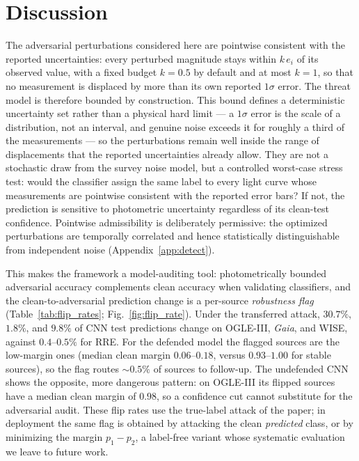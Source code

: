 \documentclass{aa}
\begin{document}
\section{Discussion}\label{sec:discussion}
The adversarial perturbations considered here are pointwise consistent with
the reported uncertainties: every perturbed magnitude stays within $k\,e_i$
of its observed value, with a fixed budget $k = 0.5$ by default and at most
$k = 1$, so that no measurement is displaced by more than its own reported
$1\sigma$ error. The threat model is therefore bounded by construction. This
bound defines a deterministic uncertainty set rather than a physical hard
limit --- a $1\sigma$ error is the scale of a distribution, not an interval,
and genuine noise exceeds it for roughly a third of the measurements --- so
the perturbations remain well inside the range of displacements that the
reported uncertainties already allow. They are not a stochastic draw from
the survey noise model, but a controlled worst-case stress test: would the
classifier assign the same label to every light curve whose measurements
are pointwise consistent with the reported error bars? If not, the
prediction is sensitive to photometric uncertainty regardless of its
clean-test confidence. Pointwise admissibility is deliberately permissive:
the optimized perturbations are temporally correlated and hence
statistically distinguishable from independent noise
(Appendix~\ref{app:detect}).

This makes the framework a model-auditing tool: photometrically bounded adversarial accuracy complements clean accuracy when validating classifiers, and the clean-to-adversarial prediction change is a per-source \emph{robustness flag} (Table~\ref{tab:flip_rates}; Fig.~\ref{fig:flip_rate}). Under the transferred attack, $30.7\%$, $1.8\%$, and $9.8\%$ of CNN test predictions change on OGLE-III, \textit{Gaia}, and WISE, against $0.4$--$0.5\%$ for RRE. For the defended model the flagged sources are the low-margin ones (median clean margin $0.06$--$0.18$, versus $0.93$--$1.00$ for stable sources), so the flag routes ${\sim}0.5\%$ of sources to follow-up. The undefended CNN shows the opposite, more dangerous pattern: on OGLE-III its flipped sources have a median clean margin of $0.98$, so a confidence cut cannot substitute for the adversarial audit. These flip rates use the true-label attack of the paper; in deployment the same flag is obtained by attacking the clean \emph{predicted} class, or by minimizing the margin $p_1 - p_2$, a label-free variant whose systematic evaluation we leave to future work.
\end{document}
